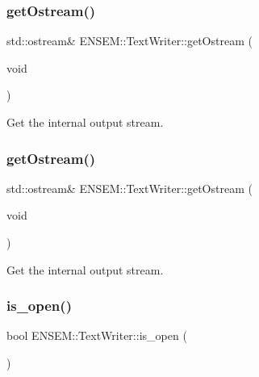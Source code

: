 \subsubsection{\texorpdfstring{getOstream()}{getOstream()}\hspace{0.1cm}{\footnotesize\ttfamily [2/3]}}
{\footnotesize\ttfamily std\+::ostream\& E\+N\+S\+E\+M\+::\+Text\+Writer\+::get\+Ostream (\begin{DoxyParamCaption}\item[{void}]{ }\end{DoxyParamCaption})\hspace{0.3cm}{\ttfamily [inline]}}



Get the internal output stream. 

\mbox{\label{classENSEM_1_1TextWriter_a40ade2e6c44ba267efdce5fb70909362}} 
\subsubsection{\texorpdfstring{getOstream()}{getOstream()}\hspace{0.1cm}{\footnotesize\ttfamily [3/3]}}
{\footnotesize\ttfamily std\+::ostream\& E\+N\+S\+E\+M\+::\+Text\+Writer\+::get\+Ostream (\begin{DoxyParamCaption}\item[{void}]{ }\end{DoxyParamCaption})\hspace{0.3cm}{\ttfamily [inline]}}



Get the internal output stream. 

\mbox{\label{classENSEM_1_1TextWriter_a6718d81018fe6a709f11cdb2f008c68b}} 
\subsubsection{\texorpdfstring{is\_open()}{is\_open()}\hspace{0.1cm}{\footnotesize\ttfamily [1/3]}}
{\footnotesize\ttfamily bool E\+N\+S\+E\+M\+::\+Text\+Writer\+::is\+\_\+open (\begin{DoxyParamCaption}{ }\end{DoxyParamCaption})}



